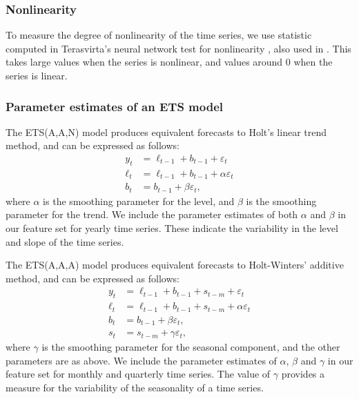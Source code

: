 \documentclass[11pt,a4paper,]{article}
\theoremstyle{definition}
\theoremstyle{definition}
\theoremstyle{definition}
\theoremstyle{remark}
\begin{document}
\hypertarget{nonlinearity}{%
\subsubsection*{Nonlinearity}\label{nonlinearity}}

To measure the degree of nonlinearity of the time series, we use
statistic computed in Terasvirta's neural network test for nonlinearity
\autocite{nonlintest}, also used in \textcite{wang2009rule}. This takes
large values when the series is nonlinear, and values around 0 when the
series is linear.

\hypertarget{parameter-estimates-of-an-ets-model}{%
\subsubsection*{Parameter estimates of an ETS
model}\label{parameter-estimates-of-an-ets-model}}

The ETS(A,A,N) model \autocite{expsmooth08} produces equivalent
forecasts to Holt's linear trend method, and can be expressed as
follows: \begin{align*}
  y_t    & = \ell_{t-1}+b_{t-1}+\varepsilon_t\\
  \ell_t & = \ell_{t-1}+b_{t-1}+\alpha \varepsilon_t\\
  b_t    & = b_{t-1}+\beta \varepsilon_t,
\end{align*} where \(\alpha\) is the smoothing parameter for the level,
and \(\beta\) is the smoothing parameter for the trend. We include the
parameter estimates of both \(\alpha\) and \(\beta\) in our feature set
for yearly time series. These indicate the variability in the level and
slope of the time series.

The ETS(A,A,A) model \autocite{expsmooth08} produces equivalent
forecasts to Holt-Winters' additive method, and can be expressed as
follows: \begin{align*}
  y_t    & = \ell_{t-1}+b_{t-1}+s_{t-m}+\varepsilon_t\\
  \ell_t & = \ell_{t-1}+b_{t-1}+s_{t-m}+\alpha \varepsilon_t\\
  b_t    & = b_{t-1}+\beta \varepsilon_t,\\
  s_t &= s_{t-m} + \gamma\varepsilon_t,
\end{align*} where \(\gamma\) is the smoothing parameter for the
seasonal component, and the other parameters are as above. We include
the parameter estimates of \(\alpha\), \(\beta\) and \(\gamma\) in our
feature set for monthly and quarterly time series. The value of
\(\gamma\) provides a measure for the variability of the seasonality of
a time series.
\end{document}
